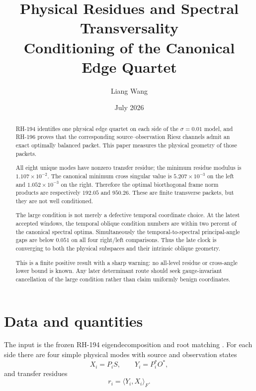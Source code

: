 \documentclass[12pt]{article}
\title{Physical Residues and Spectral Transversality\\
\large Conditioning of the Canonical Edge Quartet}
\author{Liang Wang}
\date{July 2026}
\theoremstyle{remark}
\begin{document}
\maketitle

\begin{abstract}
RH-194 identifies one physical edge quartet on each side of the
$\sigma=0.01$ model, and RH-196 proves that the corresponding
source--observation Riesz channels admit an exact optimally balanced packet.
This paper measures the physical geometry of those packets.

All eight unique modes have nonzero transfer residue; the minimum residue
modulus is $1.107\times10^{-2}$.  The canonical minimum cross singular value
is $5.207\times10^{-3}$ on the left and $1.052\times10^{-3}$ on the right.
Therefore the optimal biorthogonal frame norm products are respectively
$192.05$ and $950.26$.  These are finite transverse packets, but they are
not well conditioned.

The large condition is not merely a defective temporal coordinate choice.
At the latest accepted windows, the temporal oblique condition numbers are
within two percent of the canonical spectral optima.  Simultaneously the
temporal-to-spectral principal-angle gaps are below $0.051$ on all four
right/left comparisons.  Thus the late clock is converging to both the
physical subspaces and their intrinsic oblique geometry.

This is a finite positive result with a sharp warning: no all-level residue
or cross-angle lower bound is known.  Any later determinant route should
seek gauge-invariant cancellation of the large condition rather than claim
uniformly benign coordinates.
\end{abstract}

\section{Data and quantities}

The input is the frozen RH-194 eigendecomposition and root matching
\citep{WangRH194}.  For each side there are four simple physical modes with
source and observation states
\begin{equation}\label{eq:states}
 X_i=P_iS,
 \qquad Y_i=P_i^*O^*,
\end{equation}
and transfer residues
\begin{equation}\label{eq:residues}
 r_i=\langle Y_i,X_i\rangle_F.
\end{equation}
\end{document}
